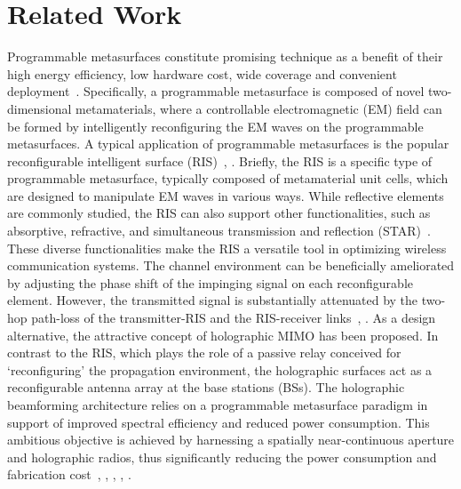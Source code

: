 \section{Related Work}
Programmable metasurfaces constitute promising technique as a benefit of their high energy efficiency, low hardware cost, wide coverage and convenient deployment~\cite{you2020channel}. Specifically, a programmable metasurface is composed of novel two-dimensional metamaterials, where a controllable electromagnetic (EM) field can be formed by intelligently reconfiguring the EM waves on the programmable metasurfaces. A typical application of programmable metasurfaces is the popular reconfigurable intelligent surface (RIS)~\cite{li2022reconfigurable}, \cite{li2024low}. Briefly, the RIS is a specific type of programmable metasurface, typically composed of metamaterial unit cells, which are designed to manipulate EM waves in various ways. While reflective elements are commonly studied, the RIS can also support other functionalities, such as absorptive, refractive, and simultaneous transmission and reflection (STAR)~\cite{li2018metasurfaces}. These diverse functionalities make the RIS a versatile tool in optimizing wireless communication systems. The channel environment can be beneficially ameliorated by adjusting the phase shift of the impinging signal on each reconfigurable element. However, the transmitted signal is substantially attenuated by the two-hop path-loss of the transmitter-RIS and the RIS-receiver links~\cite{pan2021reconfigurable}, \cite{pan2022overview}. As a design alternative, the attractive concept of holographic MIMO has been proposed. In contrast to the RIS, which plays the role of a passive relay conceived for `reconfiguring' the propagation environment, the holographic surfaces act as a reconfigurable antenna array at the base stations (BSs). The holographic beamforming architecture relies on a programmable metasurface paradigm in support of improved spectral efficiency and reduced power consumption. This ambitious objective is achieved by harnessing a spatially near-continuous aperture and holographic radios, thus significantly reducing the power consumption and fabrication cost~\cite{huang2020holographic}, \cite{li2024achievable}, \cite{yoo2023sub}, \cite{deng2023reconfigurable}, \cite{gong2024holographic}.

